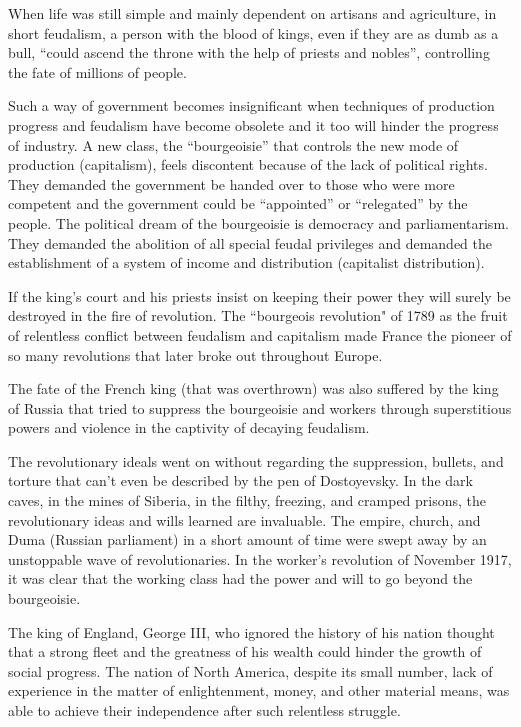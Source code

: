 When life was still simple and mainly dependent on artisans and agriculture, in short feudalism, a 
person with the blood of kings, even if they are as dumb as a bull, “could ascend the throne with the help of priests and nobles”, 
controlling the fate of millions of people.\nline

Such a way of government becomes insignificant when techniques of production progress and feudalism 
have become obsolete and it too will hinder the progress of industry. A new class, the “bourgeoisie” 
that controls the new mode of production (capitalism), feels discontent because of the lack of political rights. 
They demanded the government be handed over to those who were more competent and the government could be “appointed” or 
“relegated” by the people. The political dream of the bourgeoisie is democracy and parliamentarism. They demanded the abolition 
of all special feudal privileges and demanded the establishment of a system of income and distribution (capitalist distribution).\nline

If the king's court and his priests insist on keeping their power they will surely be destroyed in the 
fire of revolution. The “bourgeois revolution" of 1789 as the fruit of relentless conflict between feudalism 
and capitalism made France the pioneer of so many revolutions that later broke out throughout Europe.\nline

The fate of the French king (that was overthrown) was also suffered by the king of Russia that tried to 
suppress the bourgeoisie and workers through superstitious powers and violence in the captivity of decaying feudalism.\nline

The revolutionary ideals went on without regarding the suppression, bullets, and torture that can't even be described 
by the pen of Dostoyevsky. In the dark caves, in the mines of Siberia, in the filthy, freezing, and cramped prisons, 
the revolutionary ideas and wills learned are invaluable. The empire, church, and Duma (Russian parliament) in a short 
amount of time were swept away by an unstoppable wave of revolutionaries. In the worker's revolution of November 1917, 
it was clear that the working class had the power and will to go beyond the bourgeoisie.\nline

The king of England, George III, who ignored the history of his nation thought that a strong fleet 
and the greatness of his wealth could hinder the growth of social progress. The nation of North America, 
despite its small number, lack of experience in the matter of enlightenment, money, and other material means, 
was able to achieve their independence after such relentless struggle.\nline

